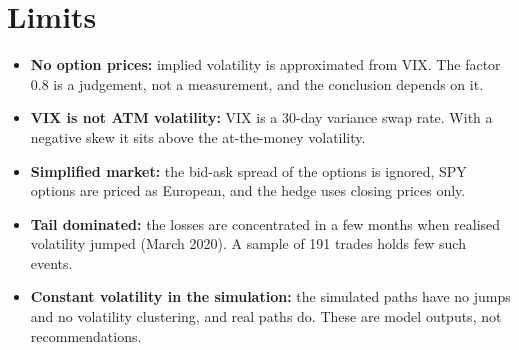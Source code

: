 \documentclass[11pt,a4paper]{article}
\begin{document}
\section{Limits}
\begin{itemize}
\item \textbf{No option prices:} implied volatility is approximated from VIX. The factor 0.8 is a judgement, not a measurement, and the conclusion depends on it.
\item \textbf{VIX is not ATM volatility:} VIX is a 30-day variance swap rate. With a negative skew it sits above the at-the-money volatility.
\item \textbf{Simplified market:} the bid-ask spread of the options is ignored, SPY options are priced as European, and the hedge uses closing prices only.
\item \textbf{Tail dominated:} the losses are concentrated in a few months when realised volatility jumped (March 2020). A sample of 191 trades holds few such events.
\item \textbf{Constant volatility in the simulation:} the simulated paths have no jumps and no volatility clustering, and real paths do. These are model outputs, not recommendations.
\end{itemize}
\end{document}
